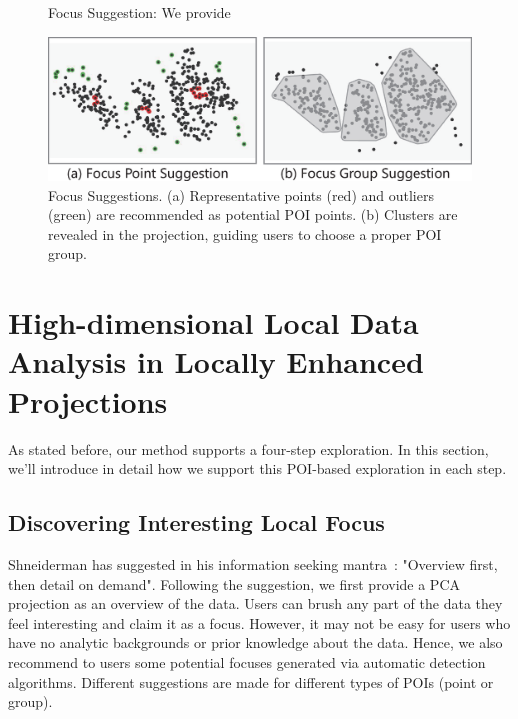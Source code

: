 \ifx
\begin{figure}[htbp]
\centering
{}
  \caption{Focus Suggestion: We provide}
\label{fig:suggestions}
  \end{figure}
  \else
\begin{figure}[htbp]
\centering
\includegraphics[width=1\linewidth]{images/suggestion_new.eps}
  \caption{Focus Suggestions. (a) Representative points (red) and outliers (green) are recommended as potential POI points. (b) Clusters are revealed in the projection, guiding users to choose a proper POI group.}
\label{fig:suggestions}
\end{figure}
  \fi
\section{High-dimensional Local Data Analysis in Locally Enhanced Projections}
As stated before, our method supports a four-step exploration. In this section, we'll introduce in detail how we support this POI-based exploration in each step.
\label{section:method}
\subsection{Discovering Interesting Local Focus}
Shneiderman has suggested in his information seeking mantra~\cite{DBLP:conf/vl/Shneiderman96}: "Overview first, then detail on demand". Following the suggestion, we first provide a PCA projection as an overview of the data. Users can brush any part of the data they feel interesting and claim it as a focus. However, it may not be easy for users who have no analytic backgrounds or prior knowledge about the data. Hence, we also recommend to users some potential focuses generated via automatic detection algorithms. Different suggestions are made for different types of POIs (point or group).

